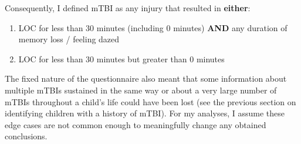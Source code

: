 \documentclass[
  letterpaper,
  DIV=11,
  numbers=noendperiod]{scrreprt}
\providecommand{\tightlist}{%
  \setlength{\itemsep}{0pt}\setlength{\parskip}{0pt}}\usepackage{longtable,booktabs,array}
\begin{document}
Consequently, I defined mTBI as any injury that resulted in
\textbf{either}:

\begin{enumerate}
\def\labelenumi{\arabic{enumi}.}
\tightlist
\item
  LOC for less than 30 minutes (including 0 minutes) \textbf{AND} any
  duration of memory loss / feeling dazed
\item
  LOC for less than 30 minutes but greater than 0 minutes
\end{enumerate}

The fixed nature of the questionnaire also meant that some information
about multiple mTBIs sustained in the same way or about a very large
number of mTBIs throughout a child's life could have been lost (see the
previous section on identifying children with a history of mTBI). For my
analyses, I assume these edge cases are not common enough to
meaningfully change any obtained conclusions.
\end{document}
